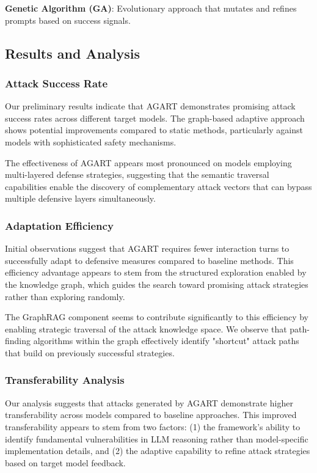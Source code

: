\textbf{Genetic Algorithm (GA)}: Evolutionary approach that mutates and refines prompts based on success signals.

\subsection{Results and Analysis}

\subsubsection{Attack Success Rate}
Our preliminary results indicate that AGART demonstrates promising attack success rates across different target models. The graph-based adaptive approach shows potential improvements compared to static methods, particularly against models with sophisticated safety mechanisms. 

The effectiveness of AGART appears most pronounced on models employing multi-layered defense strategies, suggesting that the semantic traversal capabilities enable the discovery of complementary attack vectors that can bypass multiple defensive layers simultaneously.

\subsubsection{Adaptation Efficiency}
Initial observations suggest that AGART requires fewer interaction turns to successfully adapt to defensive measures compared to baseline methods. This efficiency advantage appears to stem from the structured exploration enabled by the knowledge graph, which guides the search toward promising attack strategies rather than exploring randomly.

The GraphRAG component seems to contribute significantly to this efficiency by enabling strategic traversal of the attack knowledge space. We observe that path-finding algorithms within the graph effectively identify "shortcut" attack paths that build on previously successful strategies.

\subsubsection{Transferability Analysis}
Our analysis suggests that attacks generated by AGART demonstrate higher transferability across models compared to baseline approaches. This improved transferability appears to stem from two factors: (1) the framework's ability to identify fundamental vulnerabilities in LLM reasoning rather than model-specific implementation details, and (2) the adaptive capability to refine attack strategies based on target model feedback.

